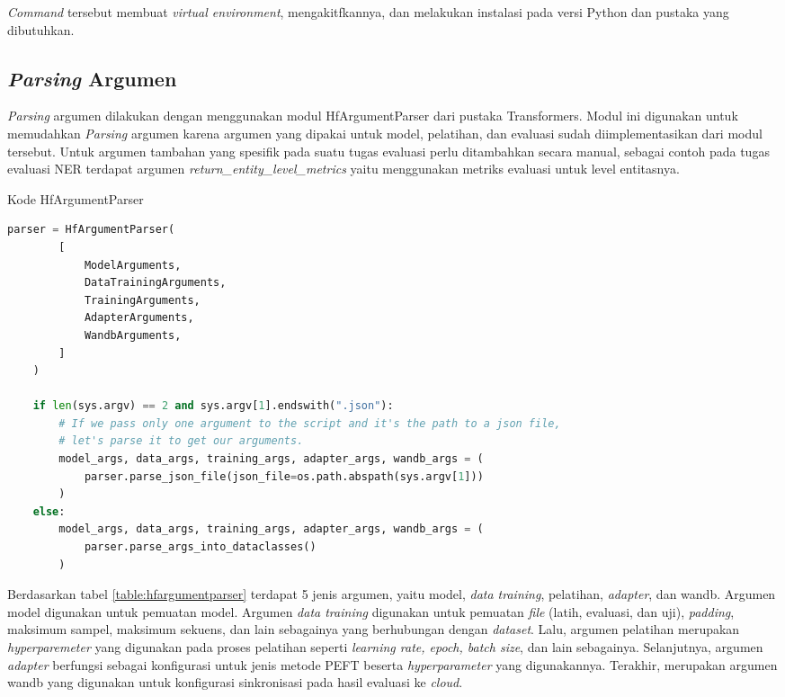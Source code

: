 \textit{Command} tersebut  membuat \textit{virtual environment}, mengakitfkannya, dan melakukan instalasi pada versi Python dan pustaka yang dibutuhkan.

\subsection{\textit{Parsing} Argumen}
\label{sec:parse-arg}

\textit{Parsing} argumen dilakukan dengan menggunakan modul HfArgumentParser dari pustaka Transformers. Modul ini digunakan untuk memudahkan \textit{Parsing} argumen karena argumen yang dipakai untuk model, pelatihan, dan evaluasi sudah diimplementasikan dari modul tersebut. Untuk argumen tambahan yang spesifik pada suatu tugas evaluasi perlu ditambahkan secara manual, sebagai contoh pada tugas evaluasi NER terdapat argumen \textit{return\_entity\_level\_metrics} yaitu menggunakan metriks evaluasi untuk level entitasnya.

\begin{table}[h]
    \caption{Kode HfArgumentParser}
    \label{table:hfargumentparser}
    \begin{lstlisting}[language=python]
    parser = HfArgumentParser(
        [
            ModelArguments,
            DataTrainingArguments,
            TrainingArguments,
            AdapterArguments,
            WandbArguments,
        ]
    )

    if len(sys.argv) == 2 and sys.argv[1].endswith(".json"):
        # If we pass only one argument to the script and it's the path to a json file,
        # let's parse it to get our arguments.
        model_args, data_args, training_args, adapter_args, wandb_args = (
            parser.parse_json_file(json_file=os.path.abspath(sys.argv[1]))
        )
    else:
        model_args, data_args, training_args, adapter_args, wandb_args = (
            parser.parse_args_into_dataclasses()
        )
    \end{lstlisting}
\end{table}

Berdasarkan tabel \ref{table:hfargumentparser} terdapat 5 jenis argumen, yaitu model, \textit{data training}, pelatihan, \textit{adapter}, dan wandb. Argumen model digunakan untuk pemuatan model. Argumen \textit{data training} digunakan untuk pemuatan \textit{file} (latih, evaluasi, dan uji), \textit{padding}, maksimum sampel, maksimum sekuens, dan lain sebagainya yang berhubungan dengan \textit{dataset}. Lalu, argumen pelatihan merupakan \textit{hyperparemeter} yang digunakan pada proses pelatihan seperti \textit{learning rate, epoch, batch size}, dan lain sebagainya. Selanjutnya, argumen \textit{adapter} berfungsi sebagai konfigurasi untuk jenis metode PEFT beserta \textit{hyperparameter} yang digunakannya. Terakhir, merupakan argumen wandb yang digunakan untuk konfigurasi sinkronisasi pada hasil evaluasi ke \textit{cloud}.

